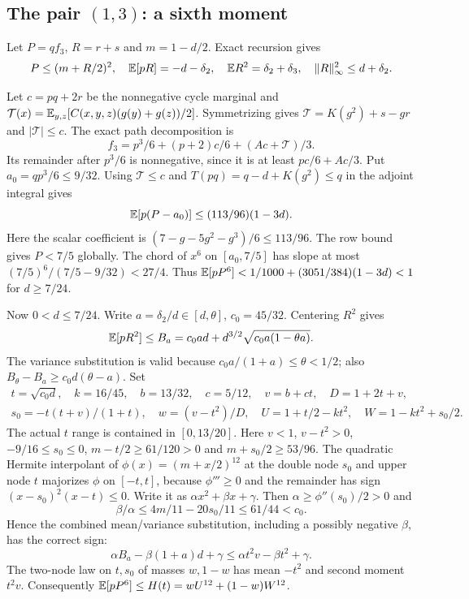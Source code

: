 \subsection[The pair (1,3): a sixth moment]{The pair $(1,3)$: a sixth moment}\label{loc:S9}
Let $P=qf_3$, $R=r+s$ and $m=1-d/2$. Exact recursion gives
\[
 P\le(m+R/2)^2,\quad\mathbb E[pR]=-d-\delta_{2},\quad
 \mathbb E R^2=\delta_{2}+\delta_{3},\quad\|R\|_\infty^2\le d+\delta_{2}.
\]

Let $c=pq+2r$ be the nonnegative cycle marginal and
$\mathcal T(x)=\mathbb E_{y,z}[C(x,y,z)(g(y)+g(z))/2]$.
Symmetrizing gives $\mathcal T=K(g^2)+s-gr$ and $|\mathcal T|\le c$.
The exact path decomposition is
\[
 f_3=p^3/6+(p+2)c/6+(Ac+\mathcal T)/3.
\]
Its remainder after $p^3/6$ is nonnegative, since it is at least
$pc/6+Ac/3$. Put $a_0=qp^3/6\le9/32$.
Using $\mathcal T\le c$ and $T(pq)=q-d+K(g^2)\le q$ in the adjoint integral gives
\[
 \mathbb E[p(P-a_0)]\le(113/96)(1-3d).
\]
Here the scalar coefficient is $(7-g-5g^2-g^3)/6\le113/96$.
The row bound gives $P<7/5$ globally. The chord of $x^6$ on
$[a_0,7/5]$ has slope at most
$(7/5)^6/(7/5-9/32)<27/4$.
Thus $\mathbb E[pP^6]<1/1000+(3051/384)(1-3d)<1$ for $d\ge7/24$.

Now $0<d\le7/24$. Write $a=\delta_{2}/d\in[d,\theta]$, $c_0=45/32$.
Centering $R^2$ gives
\[
 \mathbb E[pR^2]\le B_a=c_0ad+d^{3/2}\sqrt{c_0a(1-\theta a)}.
\]
The variance substitution is valid because $c_0a/(1+a)\le\theta<1/2$;
also $B_\theta-B_a\ge c_0d(\theta-a)$.
Set
\begin{gather*}
 t=\sqrt{c_0d},\quad k=16/45,\quad b=13/32,\quad c=5/12,\quad
 v=b+ct,\quad D=1+2t+v,\\
 s_0=-t(t+v)/(1+t),\quad w=(v-t^2)/D,\quad
 U=1+t/2-kt^2,\quad W=1-kt^2+s_0/2.
\end{gather*}
The actual $t$ range is contained in $[0,13/20]$.
Here $v<1$, $v-t^2>0$, $-9/16\le s_0\le0$,
$m-t/2\ge61/120>0$ and $m+s_0/2\ge53/96$.
The quadratic Hermite interpolant of $\phi(x)=(m+x/2)^{12}$ at
the double node $s_0$ and upper node $t$ majorizes $\phi$ on $[-t,t]$,
because $\phi'''\ge0$ and the remainder has sign
$(x-s_0)^2(x-t)\le0$. Write it as $\alpha x^2+\beta x+\gamma$.
Then $\alpha\ge\phi''(s_0)/2>0$ and
\[
 \beta/\alpha\le4m/11-20s_0/11\le61/44<c_0.
\]
Hence the combined mean/variance substitution, including a possibly
negative $\beta$, has the correct sign:
\[
 \alpha B_a-\beta(1+a)d+\gamma
 \le\alpha t^2v-\beta t^2+\gamma.
\]
The two-node law on $t,s_0$ of masses $w,1-w$ has mean $-t^2$ and second
moment $t^2v$. Consequently
$\mathbb E[pP^6]\le H(t)=wU^{12}+(1-w)W^{12}$.

